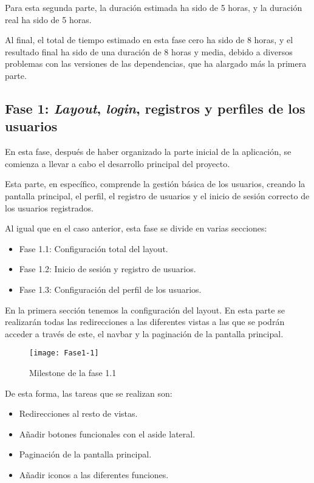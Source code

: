 Para esta segunda parte, la duración estimada ha sido de 5 horas, y la duración real ha sido de 5 horas.

Al final, el total de tiempo estimado en esta fase cero ha sido de 8 horas, y el resultado
final ha sido de una duración de 8 horas y media, debido a diversos problemas con las versiones
de las dependencias, que ha alargado más la primera parte.

\subsection{Fase 1: \emph{Layout}, \emph{login}, registros y perfiles de los usuarios}
En esta fase, después de haber organizado la parte inicial de la aplicación, se comienza a llevar
a cabo el desarrollo principal del proyecto. 

Esta parte, en específico, comprende la gestión básica de los usuarios, creando la pantalla principal, el perfil, el registro de usuarios y el inicio de sesión correcto de los usuarios registrados.

Al igual que en el caso anterior, esta fase se divide en varias secciones:
\begin{itemize}
\tightlist
\item Fase 1.1: Configuración total del layout.
\item Fase 1.2: Inicio de sesión y registro de usuarios.
\item Fase 1.3: Configuración del perfil de los usuarios.
\end{itemize}

En la primera sección tenemos la configuración del layout. En esta parte se realizarán todas las
redirecciones a las diferentes vistas a las que se podrán acceder a través de este, el navbar
y la paginación de la pantalla principal.
\begin{figure}
    \centering
    \texttt{[image: Fase1-1]}
    \caption{Milestone de la fase 1.1}
\end{figure}

De esta forma, las tareas que se realizan son:
\begin{itemize}
\tightlist
\item Redirecciones al resto de vistas.
\item Añadir botones funcionales con el aside lateral.
\item Paginación de la pantalla principal.
\item Añadir iconos a las diferentes funciones.
\end{itemize}

